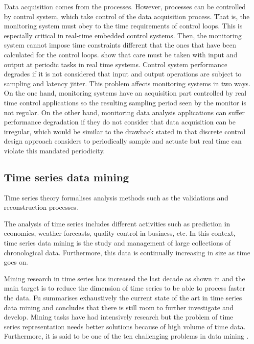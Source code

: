 Data acquisition comes from the processes. However, processes can be controlled by control system, which take control of the data acquisition process. That is, the monitoring system must obey to the time requirements of control loops. This is especially critical in real-time embedded control systems. Then, the monitoring system cannot impose time constraints different that the ones that have been calculated for the control loops. \textcite{lozoya08} show that care must be taken with input and output at periodic tasks in real time systems. Control system performance degrades if it is not considered that input and output operations are subject to sampling and latency jitter. This problem affects monitoring systems in two ways. On the one hand, monitoring systems  have an acquisition part controlled by real time control applications so the resulting sampling period seen by the monitor is not regular. On the other hand, monitoring data analysis applications can suffer performance degradation if they do not consider that data acquisition can be irregular, which would be similar to the drawback stated in \cite{lozoya08} that discrete control design approach considers to periodically sample and actuate but real time can violate this mandated periodicity.



\subsection{Time series data mining}

Time series theory formalises analysis methods such as the validations and reconstruction processes.

The analysis of time series includes different activities such as prediction in economics, weather forecasts, quality control in business, etc. In this context, time series data mining is the study and management of large collections of chronological data. Furthermore, this data is continually increasing in size as time goes on.

Mining research in time series has increased the last decade as shown in \textcite{fu11} and the main target is to reduce the dimension of time series to be able to process faster the data. Fu summarises exhaustively the current state of the art in time series data mining  and concludes that there is still room to further investigate and develop. Mining tasks have had intensively research but the problem of  time series representation needs better solutions because of high volume of time data. Furthermore, it is said to be one of the ten challenging problems in data mining \parencite{yangwu06}.
 
